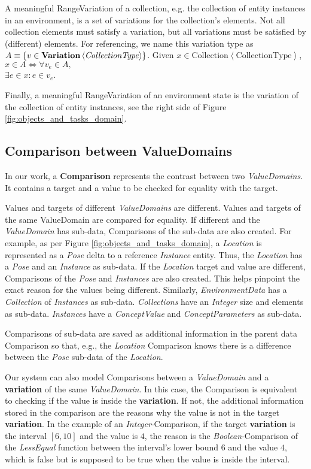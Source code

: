 A meaningful RangeVariation of a collection, e.g. the collection of entity instances in an environment, is a set of variations for the collection's elements. Not all collection elements must satisfy a variation, but all variations must be satisfied by (different) elements. For referencing, we name this variation type as $A \equiv \{v \in \text{\textbf{Variation}}\left<\text{\textit{CollectionType}}\right>\}$. Given $x \in \text{Collection}\left<\text{CollectionType}\right>$, $x \in A \Leftrightarrow \forall v_e \in A,$\\$\exists e \in x: e \in v_e$.

Finally, a meaningful RangeVariation of an environment state is the variation of the collection of entity instances, see the right side of Figure \ref{fig:objects_and_tasks_domain}.

\subsection{Comparison between ValueDomains}\label{ssec:comparisons}
In our work, a \textbf{Comparison} represents the contrast between two \textit{ValueDomains}. It contains a target and a value to be checked for equality with the target.

Values and targets of different \textit{ValueDomains} are different. Values and targets of the same ValueDomain are compared for equality. If different and the \textit{ValueDomain} has sub-data, Comparisons of the sub-data are also created. For example, as per Figure \ref{fig:objects_and_tasks_domain}, a \textit{Location} is represented as a \textit{Pose} delta to a reference \textit{Instance} entity. Thus, the \textit{Location} has a \textit{Pose} and an \textit{Instance} as sub-data. If the \textit{Location} target and value are different, Comparisons of the \textit{Pose} and \textit{Instances} are also created. This helps pinpoint the exact reason for the values being different. Similarly, \textit{EnvironmentData} has a \textit{Collection} of \textit{Instances} as sub-data. \textit{Collections} have an \textit{Integer} size and elements as sub-data. 
\textit{Instances} have a \textit{ConceptValue} and \textit{ConceptParameters} as sub-data.

Comparisons of sub-data are saved as additional information in the parent data Comparison so that, e.g., the \textit{Location} Comparison knows there is a difference between the \textit{Pose} sub-data of the \textit{Location}.

Our system can also model Comparisons between a \textit{ValueDomain} and a \textbf{variation} of the same \textit{ValueDomain}. In this case, the Comparison is equivalent to checking if the value is inside the \textbf{variation}. If not, the additional information stored in the comparison are the reasons why the value is not in the target \textbf{variation}. In the example of an \textit{Integer}-Comparison, if the target \textbf{variation} is the interval $\left[6, 10\right]$ and the value is $4$, the reason is the \textit{Boolean}-Comparison of the \textit{LessEqual} function between the interval's lower bound $6$ and the value $4$, which is false but is supposed to be true when the value is inside the interval.

